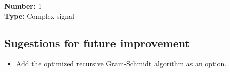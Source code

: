 \begin{refsection}
\textbf{Number:} 1\\
\textbf{Type:} Complex signal

\subsection*{Sugestions for future improvement}

\begin{itemize}
	\item Add the optimized recursive Gram-Schmidt algorithm as an option.
\end{itemize}

\clearpage
\printbibliography[heading=subbibliography]
\end{refsection}
\cleardoublepage



%